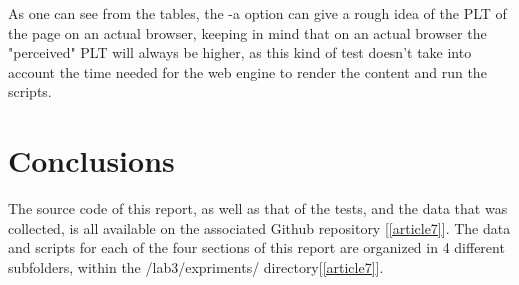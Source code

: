 \documentclass[a4paper,10pt]{article}
\begin{document}
\begin{table}[h!]
\centering

\caption{with the -a option}
\label{fig:table7}
\end{table}


As one can see from the tables, the -a option can give a rough idea of the PLT of the page on an actual browser, keeping in mind that on an actual browser the "perceived" PLT will always be higher, as this kind of test doesn't take into account the time needed for the web engine to render the content and run the scripts.


\clearpage


\section{Conclusions}

The source code of this report, as well as that of the tests, and the data that was collected, is all available on the associated Github repository [\ref{article7}]. The data and scripts for each of the four sections of this report are organized in 4 different subfolders, within the /lab3/expriments/ directory[\ref{article7}]. 
\end{document}
